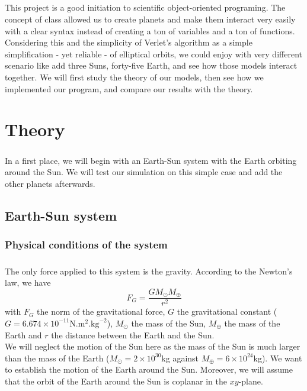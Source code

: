\documentclass[a4paper, twoside, 11pt]{report}
\theoremstyle{theorem}
\theoremstyle{remark}
\theoremstyle{exemple}
\begin{document}
    \paragraph{}This project is a good initiation to scientific object-oriented programing. The concept of class allowed us to create planets and make them interact very easily with a clear syntax instead of creating a ton of variables and a ton of functions. Considering this and the simplicity of Verlet's algorithm as a simple simplification - yet reliable - of elliptical orbits, we could enjoy with very different scenario like add three Suns, forty-five Earth, and see how those models interact together. We will first study the theory of our models, then see how we implemented our program, and compare our results with the theory. 
    

\chapter{Theory}
    
    \paragraph{}In a first place, we will begin with an Earth-Sun system with the Earth orbiting around the Sun. We will test our simulation on this simple case and add the other planets afterwards. 

    \section{Earth-Sun system}
    
        \subsection{Physical conditions of the system}
        
            \paragraph{}The only force applied to this system is the gravity. According to the Newton's law, we have 
                \begin{equation}
                F_G = \frac{GM_{\odot}M_{\oplus}}{r^2}
                \tag{1}
                \end{equation}
            with $F_G$ the norm of the gravitational force, $G$ the gravitational constant ($G=6.674 \times 10^{-11} \mathrm{N}.\mathrm{m}^2.\mathrm{kg}^{-2}$), $M_{\odot}$ the mass of the Sun, $M_{\oplus}$ the mass of the Earth and $r$ the distance between the Earth and the Sun.\\
            We will neglect the motion of the Sun here as the mass of the Sun is much larger than the mass of the Earth ($M_{\odot} = 2 \times 10^{30}$kg against $M_{\oplus} = 6 \times 10^{24}$kg). We want to establish the motion of the Earth around the Sun. Moreover, we will assume that the orbit of the Earth around the Sun is coplanar in the $xy$-plane.
\end{document}
